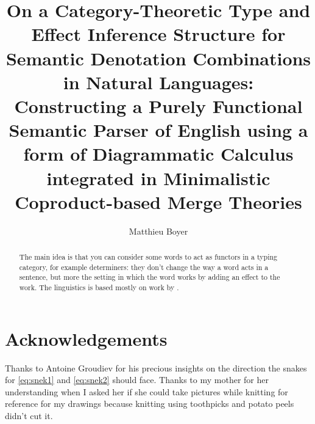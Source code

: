\documentclass[math, english, info]{tcart}
\title{On a Category-Theoretic Type and Effect Inference Structure for Semantic Denotation Combinations in Natural Languages:\\ Constructing a Purely Functional Semantic Parser of English using a form of Diagrammatic Calculus integrated in Minimalistic Coproduct-based Merge Theories}
\author{Matthieu Boyer}
\begin{document}
\maketitle
\tableofcontents

\begin{abstract}
	The main idea is that you can consider some words to act as functors in a typing category, for example determiners:
	they don't change the way a word acts in a sentence,
	but more the setting in which the word works by adding an effect to the work.
	The linguistics is based mostly on work by .
\end{abstract}










\section*{Acknowledgements}
Thanks to Antoine Groudiev for his precious insights on the direction the
snakes for \eqref{eq:snek1} and \eqref{eq:snek2} should face.
Thanks to my mother for her understanding when I asked her if she could take
pictures while knitting for reference for my drawings because knitting using
toothpicks and potato peels didn't cut it.

\appendix






\end{document}
